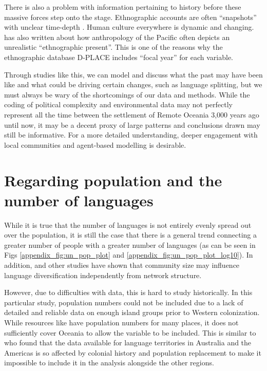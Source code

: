 \documentclass[12pt,letterpaper]{article}
\begin{document}
There is also a problem with information pertaining to history before these massive forces step onto the stage. Ethnographic accounts are often ``snapshots'' with unclear time-depth 
 \citep[113]{bedford2008northern}. Human culture everywhere is dynamic and changing. \citet{meleisea1995} has also written about how anthropology of the Pacific often depicts an unrealistic ``ethnographic present''. This is one of the reasons why the ethnographic database D-PLACE \citep{d_place_all} includes ``focal year'' for each variable. 

Through studies like this, we can model and discuss what the past may have been like and what could be driving certain changes, such as language splitting, but we must always be wary of the shortcomings of our data and methods. While the coding of political complexity and environmental data may not perfectly represent all the time between the settlement of Remote Oceania 3,000 years ago until now, it may be a decent proxy of large patterns and conclusions drawn may still be informative. For a more detailed understanding, deeper engagement with local communities and agent-based modelling is desirable.
\newpage

\section{Regarding population and the number of languages}
\label{appendix_pop_vs_languages}
While it is true that the number of languages is not entirely evenly spread out over the population, it is still the case that there is a general trend connecting a greater number of people with a greater number of languages (as can be seen in Figs \ref{appendix_fig:un_pop_plot} and \ref{appendix_fig:un_pop_plot_log10}). In addition,  \citet{raviv2019larger} and other studies have shown that community size may influence language diversification independently from network structure. 

However, due to difficulties with data, this is hard to study historically. In this particular study, population numbers could not be included due to a lack of detailed and reliable data on enough island groups prior to Western colonization. While resources like \citet{elcat} have population numbers for many places, it does not sufficiently cover Oceania to allow the variable to be included. This is similar to \citet[7340-7341]{curriemace2009} who found that the data available for language territories in Australia and the Americas is so affected by colonial history and population replacement to make it impossible to include it in the analysis alongside the other regions. 
\end{document}
